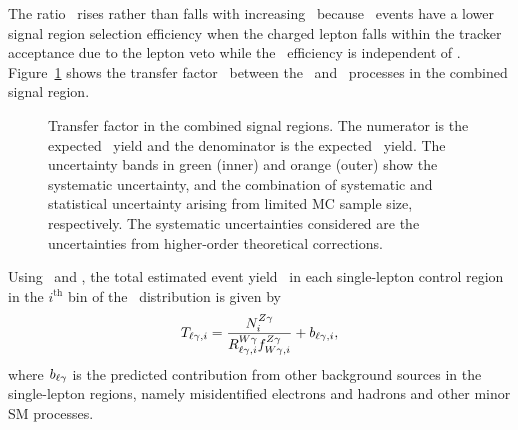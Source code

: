 The ratio \fZW\ rises rather than falls with increasing \ETg\ because \wlng\ events have a lower signal region selection efficiency when the charged lepton falls within the tracker acceptance due to the lepton veto while the \zinvg\ efficiency is independent of \ETg.
Figure~\ref{fig:tf_wz} shows the transfer factor \fZW\ between the \zinvg\ and \wlng\ processes in the combined signal region.


\begin{figure}[htbp]
  \centering
  \caption{
    Transfer factor \fZW in the combined signal regions.
    The numerator is the expected \zinvg\ yield and the denominator is the expected \wlng\ yield.
    The uncertainty bands in green (inner) and orange (outer) show the systematic uncertainty, and the combination of systematic and statistical uncertainty arising from limited MC sample size, respectively. 
    The systematic uncertainties considered are the uncertainties from higher-order theoretical corrections.
  }
  \label{fig:tf_wz}
\end{figure}

Using \RWl\ and \fZW, the total estimated event yield \Tl\ in each single-lepton control region in the $i^\mathrm{th}$ bin of the \ETg\ distribution is given by
\begin{equation}
  \Tl[,i] = \frac{\NZg[i]}{\RWl[,i]\fZW[,i]} + b_{\ell\Pgg,i},
\end{equation}
where $b_{\ell\Pgg}$ is the predicted contribution from other background sources in the single-lepton regions, namely misidentified electrons and hadrons and other minor SM processes.
